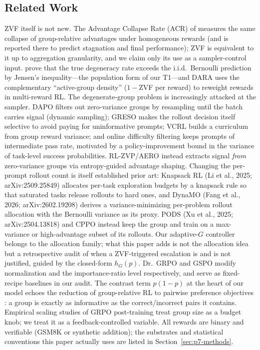 \subsection{Related Work}
\label{sec:p7-related}
ZVF itself is not new. The Advantage Collapse Rate (ACR) of
\citet{he2026advantage} measures the same collapse of group-relative advantages
under homogeneous rewards (and is reported there to predict stagnation and
final performance); ZVF is equivalent to it up to aggregation granularity, and
we claim only its use as a sampler-control input. \citet{nie2026gradstarvation}
prove that the true degeneracy rate exceeds the i.i.d.\ Bernoulli prediction by
Jensen's inequality---the population form of our T1---and DARA
\citep{zheng2026dara} uses the complementary ``active-group density''
($1-$ZVF per reward) to reweight rewards in multi-reward RL.
The degenerate-group problem is increasingly attacked at the sampler. DAPO
\citep{yu2025dapo} filters out zero-variance groups by resampling until the
batch carries signal (dynamic sampling); GRESO \citep{zhang2026greso} makes
the rollout decision itself selective to avoid paying for uninformative
prompts; VCRL \citep{jiang2025vcrl} builds a curriculum from group reward
variance; and online difficulty filtering \citep{bae2025online} keeps prompts
of intermediate pass rate, motivated by a policy-improvement bound in the
variance of task-level success probabilities. RL-ZVP/AERO \citep{le2025rlzvp} instead extracts signal \emph{from}
zero-variance groups via entropy-guided advantage shaping. Changing the
per-prompt rollout count is itself established prior art: Knapsack RL (Li et
al., 2025; arXiv:2509.25849) allocates per-task exploration budgets by a
knapsack rule so that saturated tasks release rollouts to hard ones, and DynaMO
(Fang et al., 2026; arXiv:2602.19208) derives a variance-minimizing per-problem
rollout allocation with the Bernoulli variance as its proxy. PODS (Xu et al.,
2025; arXiv:2504.13818) and CPPO \citep{lin2025cppo} instead keep the group
and train on a max-variance or high-advantage subset of its rollouts. Our
adaptive-$G$ controller belongs to the allocation family; what this paper
adds is not the allocation idea but a retrospective audit of when a
ZVF-triggered escalation is and is not justified, guided by the closed-form
$h_G(p)$. Dr.~GRPO \citep{tong2025drgrpo} and GSPO
\citep{qwen2025gspo} modify normalization and the importance-ratio level
respectively, and serve as fixed-recipe baselines in our audit. The
contrast term $p(1-p)$ at the heart of our model echoes the reduction of
group-relative RL to pairwise preference objectives
\citep{wu2025grpodpo, rafailov2024direct}: a group is exactly as informative
as the correct/incorrect pairs it contains. Empirical scaling studies of
GRPO post-training \citep{tan2025scalingrl} treat group size as a budget
knob; we treat it as a feedback-controlled variable. All rewards are binary
and verifiable (GSM8K \citep{cobbe2021training} or synthetic addition); the
substrates and statistical conventions this paper actually uses are listed
in Section~\ref{sec:p7-methods}.
